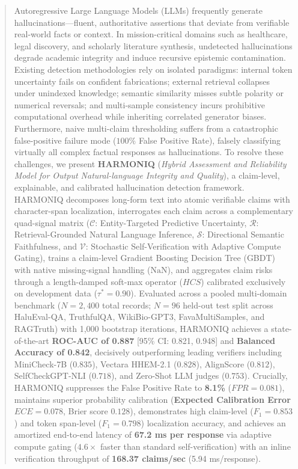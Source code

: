 \documentclass[conference]{IEEEtran}
\begin{document}
\begin{abstract}
Autoregressive Large Language Models (LLMs) frequently generate hallucinations---fluent, authoritative assertions that deviate from verifiable real-world facts or context. In mission-critical domains such as healthcare, legal discovery, and scholarly literature synthesis, undetected hallucinations degrade academic integrity and induce recursive epistemic contamination. Existing detection methodologies rely on isolated paradigms: internal token uncertainty fails on confident fabrications; external retrieval collapses under unindexed knowledge; semantic similarity misses subtle polarity or numerical reversals; and multi-sample consistency incurs prohibitive computational overhead while inheriting correlated generator biases. Furthermore, naive multi-claim thresholding suffers from a catastrophic false-positive failure mode ($100\%$ False Positive Rate), falsely classifying virtually all complex factual responses as hallucinations. To resolve these challenges, we present \textbf{HARMONIQ} (\textit{Hybrid Assessment and Reliability Model for Output Natural-language Integrity and Quality}), a claim-level, explainable, and calibrated hallucination detection framework. HARMONIQ decomposes long-form text into atomic verifiable claims with character-span localization, interrogates each claim across a complementary quad-signal matrix ($\mathcal{C}$: Entity-Targeted Predictive Uncertainty, $\mathcal{R}$: Retrieval-Grounded Natural Language Inference, $\mathcal{S}$: Directional Semantic Faithfulness, and $\mathcal{V}$: Stochastic Self-Verification with Adaptive Compute Gating), trains a claim-level Gradient Boosting Decision Tree (GBDT) with native missing-signal handling ($\mathrm{NaN}$), and aggregates claim risks through a length-damped soft-max operator ($HCS$) calibrated exclusively on development data ($\tau^* = 0.90$). Evaluated across a pooled multi-domain benchmark ($N = 2,400$ total records; $N = 96$ held-out test split across HaluEval-QA, TruthfulQA, WikiBio-GPT3, FavaMultiSamples, and RAGTruth) with 1,000 bootstrap iterations, HARMONIQ achieves a state-of-the-art \textbf{ROC-AUC of 0.887} [95\% CI: 0.821, 0.948] and \textbf{Balanced Accuracy of 0.842}, decisively outperforming leading verifiers including MiniCheck-7B ($0.835$), Vectara HHEM-2.1 ($0.828$), AlignScore ($0.812$), SelfCheckGPT-NLI ($0.718$), and Zero-Shot LLM judges ($0.753$). Crucially, HARMONIQ suppresses the False Positive Rate to \textbf{8.1\%} ($FPR = 0.081$), maintains superior probability calibration (\textbf{Expected Calibration Error $ECE = 0.078$}, Brier score $0.128$), demonstrates high claim-level ($F_1 = 0.853$) and token span-level ($F_1 = 0.798$) localization accuracy, and achieves an amortized end-to-end latency of \textbf{67.2 ms per response} via adaptive compute gating ($4.6\times$ faster than standard self-verification) with an inline verification throughput of \textbf{168.37 claims/sec} (5.94 ms/response).
\end{abstract}
\end{document}
